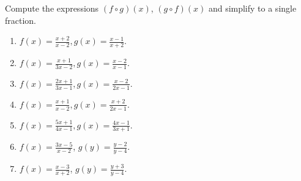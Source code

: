Compute the expressions $(f\circ g)(x)$, $(g\circ f)(x)$ and simplify to a single fraction. 

\begin{enumerate}
\item $\displaystyle f{}({{x}})=\frac{x+2}{x-2},
g{}({{x}})=\frac{x-1}{x+2}$.

\item 
$\displaystyle f{}({{x}})=\frac{x+1}{3x-2},
g{}({{x}})=\frac{x-2}{x-1}
$.

\item 
$\displaystyle f{}({{x}})=\frac{2x+1}{3x-1},
g{}({{x}})=\frac{x-2}{2x-1}
$.

\item 
$\displaystyle f{}({{x}})=\frac{x+1}{x-2},
g{}({{x}})=\frac{x+2}{2x-1}
$.

\item 
$\displaystyle f{}({{x}})=\frac{5x+1}{4x-1},
g{}({{x}})=\frac{4x-1}{3x+1}
$.

\item $\displaystyle  f(x)= \frac{3x-5}{x-2}$, $\displaystyle g(y)=\frac{y-2 }{y-4} $. 

\item $\displaystyle  f(x)= \frac{x-3}{x+2}$, $\displaystyle g(y)=\frac{y+3 }{y-4} $. 

\end{enumerate}
